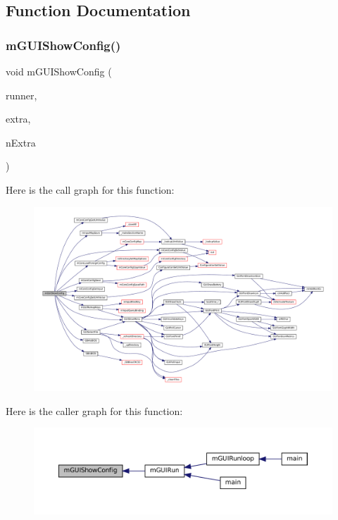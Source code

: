 \subsection{Function Documentation}
\mbox{\label{gui-config_8h_a505ebe8c0708157c31aff0d023cb6631}} 
\subsubsection{\texorpdfstring{m\+G\+U\+I\+Show\+Config()}{mGUIShowConfig()}}
{\footnotesize\ttfamily void m\+G\+U\+I\+Show\+Config (\begin{DoxyParamCaption}\item[{struct \mbox{\hyperlink{structm_g_u_i_runner}{m\+G\+U\+I\+Runner}} $\ast$}]{runner,  }\item[{struct G\+U\+I\+Menu\+Item $\ast$}]{extra,  }\item[{size\+\_\+t}]{n\+Extra }\end{DoxyParamCaption})}

Here is the call graph for this function\+:
\nopagebreak
\begin{figure}[H]
\begin{center}
\leavevmode
\includegraphics[width=350pt]{gui-config_8h_a505ebe8c0708157c31aff0d023cb6631_cgraph}
\end{center}
\end{figure}
Here is the caller graph for this function\+:
\nopagebreak
\begin{figure}[H]
\begin{center}
\leavevmode
\includegraphics[width=350pt]{gui-config_8h_a505ebe8c0708157c31aff0d023cb6631_icgraph}
\end{center}
\end{figure}
